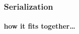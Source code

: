 \documentclass[compress,table,xcolor=table]{beamer}
\begin{document}
\begin{frame}[fragile]
  \frametitle{Serialization}
  \framesubtitle{how it fits together\ldots}
  \begin{columns}
    \begin{column}{.50\textwidth}
      \colorbox{gray}{
        \begin{minipage}{\dimexpr\textwidth\relax}
        \centering

\end{minipage}}
\end{column}
\end{columns}
\end{frame}
\end{document}
